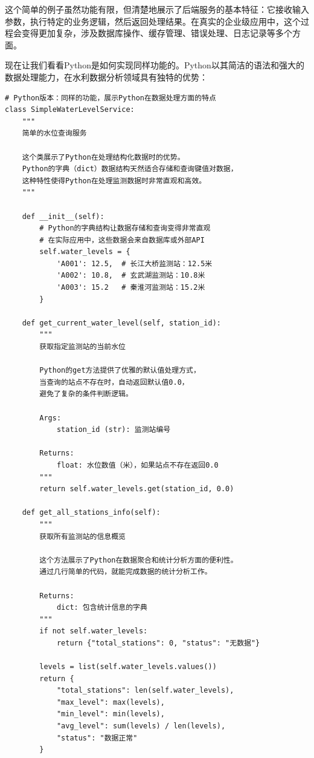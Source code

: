 这个简单的例子虽然功能有限，但清楚地展示了后端服务的基本特征：它接收输入参数，执行特定的业务逻辑，然后返回处理结果。在真实的企业级应用中，这个过程会变得更加复杂，涉及数据库操作、缓存管理、错误处理、日志记录等多个方面。

现在让我们看看Python是如何实现同样功能的。Python以其简洁的语法和强大的数据处理能力，在水利数据分析领域具有独特的优势：

\begin{lstlisting}[style=python]
# Python版本：同样的功能，展示Python在数据处理方面的特点
class SimpleWaterLevelService:
    """
    简单的水位查询服务
    
    这个类展示了Python在处理结构化数据时的优势。
    Python的字典（dict）数据结构天然适合存储和查询键值对数据，
    这种特性使得Python在处理监测数据时非常直观和高效。
    """
    
    def __init__(self):
        # Python的字典结构让数据存储和查询变得非常直观
        # 在实际应用中，这些数据会来自数据库或外部API
        self.water_levels = {
            'A001': 12.5,  # 长江大桥监测站：12.5米
            'A002': 10.8,  # 玄武湖监测站：10.8米
            'A003': 15.2   # 秦淮河监测站：15.2米
        }
    
    def get_current_water_level(self, station_id):
        """
        获取指定监测站的当前水位
        
        Python的get方法提供了优雅的默认值处理方式，
        当查询的站点不存在时，自动返回默认值0.0，
        避免了复杂的条件判断逻辑。
        
        Args:
            station_id (str): 监测站编号
            
        Returns:
            float: 水位数值（米），如果站点不存在返回0.0
        """
        return self.water_levels.get(station_id, 0.0)
    
    def get_all_stations_info(self):
        """
        获取所有监测站的信息概览
        
        这个方法展示了Python在数据聚合和统计分析方面的便利性。
        通过几行简单的代码，就能完成数据的统计分析工作。
        
        Returns:
            dict: 包含统计信息的字典
        """
        if not self.water_levels:
            return {"total_stations": 0, "status": "无数据"}
        
        levels = list(self.water_levels.values())
        return {
            "total_stations": len(self.water_levels),
            "max_level": max(levels),
            "min_level": min(levels),
            "avg_level": sum(levels) / len(levels),
            "status": "数据正常"
        }
\end{lstlisting}

